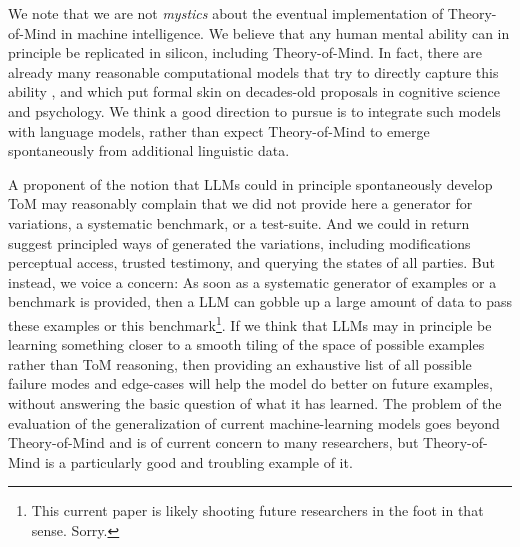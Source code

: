 \documentclass{article}
\begin{document}
We note that we are not \textit{mystics} about the eventual implementation of Theory-of-Mind in machine intelligence. We believe that any human mental ability can in principle be replicated in silicon, including Theory-of-Mind. In fact, there are already many reasonable computational models that try to directly capture this ability \citep[e.g.][]{baker2009action,baker2017rational,jara2016naive,jara2019theory,liu2017ten,shu2021agent}, and which put formal skin on decades-old proposals in cognitive science and psychology. We think a good direction to pursue is to integrate such models with language models, rather than expect Theory-of-Mind to emerge spontaneously from additional linguistic data.  

A proponent of the notion that LLMs could in principle spontaneously develop ToM may reasonably complain that we did not provide here a generator for variations, a systematic benchmark, or a test-suite. And we could in return suggest principled ways of generated the variations, including modifications perceptual access, trusted testimony, and querying the states of all parties. But instead, we voice a concern: As soon as a systematic generator of examples or a benchmark is provided, then a LLM can gobble up a large amount of data to pass these examples or this benchmark\footnote{This current paper is likely shooting future researchers in the foot in that sense. Sorry.}. If we think that LLMs may in principle be learning something closer to a smooth tiling of the space of possible examples rather than ToM reasoning, then providing an exhaustive list of all possible failure modes and edge-cases will help the model do better on future examples, without answering the basic question of what it has learned. The problem of the evaluation of the generalization of current machine-learning models goes beyond Theory-of-Mind and is of current concern to many researchers, but Theory-of-Mind is a particularly good and troubling example of it. 
\end{document}
